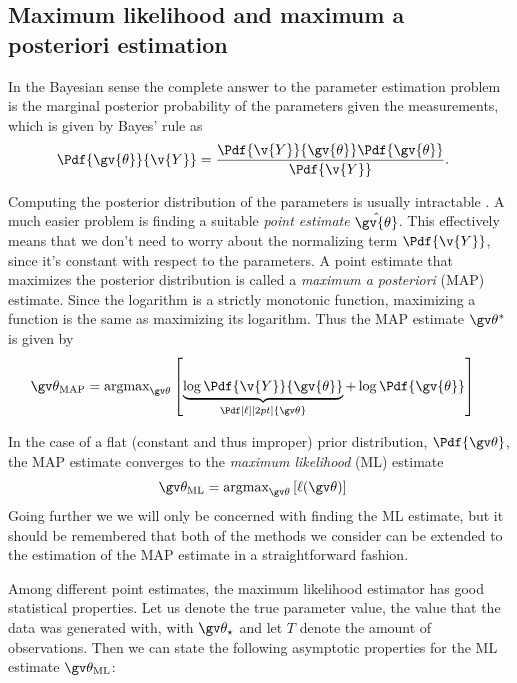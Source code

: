 \subsection{Maximum likelihood and maximum a posteriori estimation}%

In the Bayesian sense the complete answer to the parameter estimation
problem is the marginal posterior probability of the parameters
given the measurements, which is given by Bayes' rule as
\begin{align}
	\Pdf{\gv{\theta}}{\v{Y}}&=\frac{\Pdf{\v{Y}}{\gv{\theta}}\Pdf{\gv{\theta}}}{\Pdf{\v{Y}}}.
	\label{eq:param_post}
\end{align}

Computing the posterior distribution of the parameters is usually intractable . A much
easier problem is finding a suitable \emph{point estimate} $\hat{\gv{\theta}}$.
This effectively means that we don't need to worry about the normalizing
term $\Pdf{\v{Y}}$, since it's constant with respect to the parameters. 
A point estimate that maximizes the posterior distribution
is called a \emph{maximum a posteriori} (MAP) estimate. 
Since the logarithm is a strictly monotonic function, maximizing a function
is the same as maximizing its logarithm. Thus the MAP estimate $\Th^*$ is given by 
\begin{align}
	\Th_{\text{MAP}} &= \text{argmax}_{\Th}\left[\underbrace{\log \Pdf{\v{Y}}{\gv{\theta}}}_{\Pdf[\ell][2pt]{\Th}} + \log\Pdf{\gv{\theta}}\right]
	\label{eq:MAP}
\end{align}

In the case of a flat (constant and thus improper)
prior distribution, $\Pdf{\Th}$, the MAP estimate converges to the
\emph{maximum likelihood} (ML) estimate
\begin{align}
	\Th_{\text{ML}} &= \text{argmax}_{\Th}\left[\lLH\right]
	\label{eq:ML}
\end{align}
Going further we we will only be concerned with finding the ML estimate, but it should
be remembered that both of the methods we consider can be extended
to the estimation of the MAP estimate in a straightforward fashion.

Among different point estimates, the maximum likelihood estimator has good statistical properties.
Let us denote the true parameter value, the value that the data was generated with, with $\Th_\star$ and 
let $T$ denote the amount of observations.
Then we can state the following asymptotic properties for the ML estimate $\Th_{\text{ML}}$:

